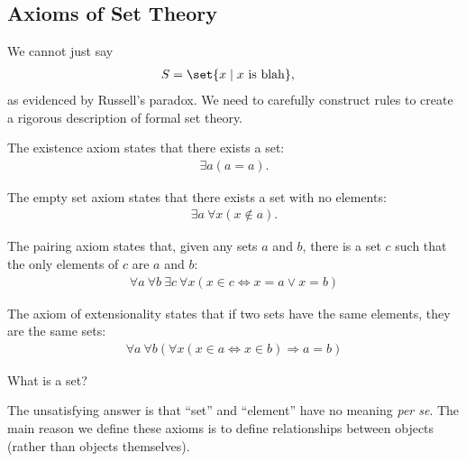 \documentclass[10pt]{mypackage}
\begin{document}
\subsection{Axioms of Set Theory}%
We cannot just say
\begin{align*}
  S &= \set{x\mid x\text{ is blah}},
\end{align*}
as evidenced by Russell's paradox. We need to carefully construct rules to create a rigorous description of formal set theory.
\begin{axiom}[Existence]
  The existence axiom states that there exists a set:
  \begin{align*}
    \exists a \left(a = a\right).
  \end{align*}
\end{axiom}
\begin{axiom}
  The empty set axiom states that there exists a set with no elements:
  \begin{align*}
    \exists a\: \forall x\left(x\notin a\right).
  \end{align*}
\end{axiom}
\begin{axiom}[Pairing]
  The pairing axiom states that, given any sets $a$ and $b$, there is a set $c$ such that the only elements of $c$ are $a$ and $b$:
  \begin{align*}
    \forall a\:\forall b\:\exists c\:\forall x\left(x\in c \Leftrightarrow x = a \vee x = b\right)
  \end{align*}
\end{axiom}
\begin{axiom}[Extensionality]
  The axiom of extensionality states that if two sets have the same elements, they are the same sets:
  \begin{align*}
    \forall a\:\forall b\left(\forall x\left(x\in a\Leftrightarrow x\in b\right) \Rightarrow a = b\right)
  \end{align*}
\end{axiom}
\begin{question}
  What is a set?
\end{question}
\begin{answer}
  The unsatisfying answer is that ``set'' and ``element'' have no meaning \textit{per se}. The main reason we define these axioms is to define relationships between objects (rather than objects themselves).
\end{answer}
\end{document}
